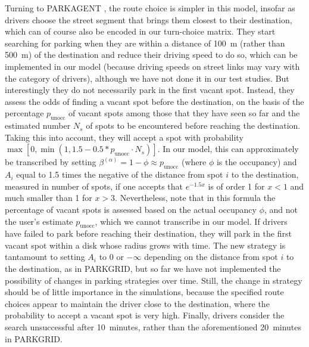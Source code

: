 \documentclass[trsc,reprint]{informs3}
\newcommand{\alp}{^{(\alpha)}}
\begin{document}
\begin{APPENDICES}
{Turning to PARKAGENT \citep{benenson2008parkagent}, the route choice is simpler in this model, insofar as drivers choose the street segment that brings them closest to their destination, which
can of course also be encoded in our turn-choice matrix. 
They start searching for parking when they are within a distance of 100~m (rather than 500~m) of the destination and reduce their driving speed to do so, which can be implemented in our model (because driving speeds on street links may vary with the category of drivers), although we have not done it in our test studies. But interestingly they do not necessarily park in the first vacant spot. Instead, they assess the odds of finding a vacant spot before the destination, on the basis of the percentage $p_\mathrm{unocc}$ of vacant spots among those that they have seen so far and the estimated number $N_s$ of 
spots to be encountered before reaching the destination. Taking this into account, they will
accept a spot with probability $\max[0, \min(1, 1.5-0.5*p_\mathrm{unocc}\cdot N_s)]$. In our model, this can approximately be transcribed by setting $\beta\alp=1-\phi \approx p_\mathrm{unocc}$ (where $\phi$ is the occupancy) and $A_i$ equal to 1.5 times the negative of the distance from spot $i$ to the destination, measured in number of spots, if one accepts that  $e^{-1.5x}$ is of order 1  for $x<1$ and much smaller than 1 for $x>3$. Nevertheless, note that in this formula the percentage of vacant spots is assessed based on the
actual occupancy $\phi$, and not the user's estimate $p_\mathrm{unocc}$, which we cannot transcribe
in our model. 
If drivers have failed to park 
before reaching their destination, they  will park in the first vacant spot within a disk whose radius grows with time. The new strategy is tantamount to setting $A_i$ to $0$ or $-\infty$ depending on the distance from spot $i$ to the destination, as in PARKGRID, but so far we
have not implemented the possibility of changes in parking strategies over time. Still, 
the change in strategy should be of little importance in the simulations, because the specified route choices appear to maintain the driver close to the destination, where the probability to 
accept a vacant spot is very high.
Finally, drivers consider the search unsuccessful after 10~minutes, rather than the aforementioned 20~minutes in PARKGRID.

}
\end{APPENDICES}
\end{document}
